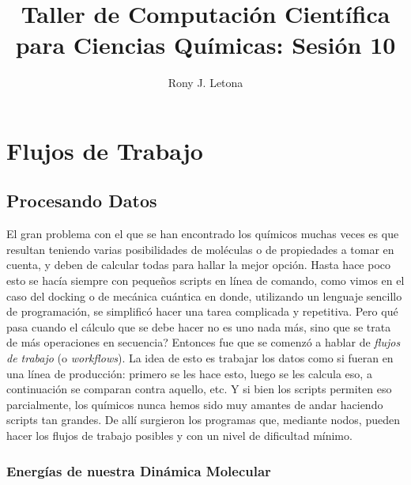 \documentclass[10pt,letterpaper]{article}
\author{Rony J. Letona}
\title{Taller de Computaci\'on Cient\'ifica para Ciencias Qu\'imicas: Sesi\'on 10}
\begin{document}
\maketitle

\section{Flujos de Trabajo}


\subsection{Procesando Datos}
El gran problema con el que se han encontrado los qu\'imicos muchas veces es que resultan teniendo varias posibilidades de mol\'eculas o de propiedades a tomar en cuenta, y deben de calcular todas para hallar la mejor opci\'on. Hasta hace poco esto se hac\'ia siempre con peque\~nos scripts en l\'inea de comando, como vimos en el caso del docking o de mec\'anica cu\'antica en donde, utilizando un lenguaje sencillo de programaci\'on, se simplific\'o hacer una tarea complicada y repetitiva. Pero qu\'e pasa cuando el c\'alculo que se debe hacer no es uno nada m\'as, sino que se trata de m\'as operaciones en secuencia? Entonces fue que se comenz\'o a hablar de \emph{flujos de trabajo} (o \emph{workflows}). La idea de esto es trabajar los datos como si fueran en una l\'inea de producci\'on: primero se les hace esto, luego se les calcula eso, a continuaci\'on se comparan contra aquello, etc. Y si bien los scripts permiten eso parcialmente, los qu\'imicos nunca hemos sido muy amantes de andar haciendo scripts tan grandes. De all\'i surgieron los programas que, mediante nodos, pueden hacer los flujos de trabajo posibles y con un nivel de dificultad m\'inimo.\\

\subsubsection{Energ\'ias de nuestra Din\'amica Molecular}
\end{document}
